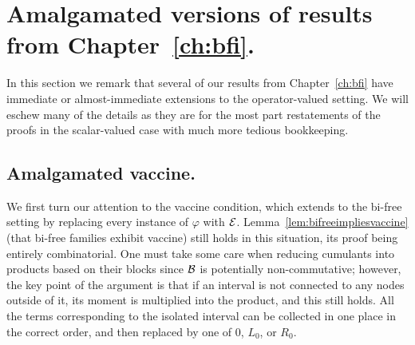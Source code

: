 	  \section{Amalgamated versions of results from Chapter~\ref{ch:bfi}.}
	  In this section we remark that several of our results from Chapter~\ref{ch:bfi} have immediate or almost-immediate extensions to the operator-valued setting.
	  We will eschew many of the details as they are for the most part restatements of the proofs in the scalar-valued case with much more tedious bookkeeping.

	  \subsection{Amalgamated vaccine.}
	  We first turn our attention to the vaccine condition, which extends to the bi-free setting by replacing every instance of $\varphi$ with $\mathcal{E}$.
	  Lemma~\ref{lem:bifreeimpliesvaccine} (that bi-free families exhibit vaccine) still holds in this situation, its proof being entirely combinatorial.
	  One must take some care when reducing cumulants into products based on their blocks since $\mathcal{B}$ is potentially non-commutative; however, the key point of the argument is that if an interval is not connected to any nodes outside of it, its moment is multiplied into the product, and this still holds.
	  All the terms corresponding to the isolated interval can be collected in one place in the correct order, and then replaced by one of $0$, $L_0$, or $R_0$.

